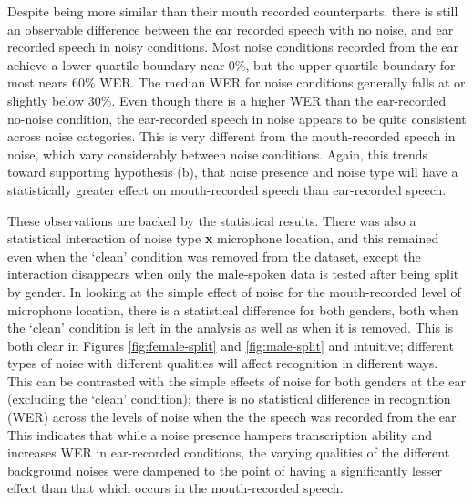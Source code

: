 Despite being more similar than their mouth recorded counterparts, there is still an observable difference between the ear recorded speech with no noise, and ear recorded speech in noisy conditions.  Most noise conditions recorded from the ear achieve a lower quartile boundary near 0\%, but the upper quartile boundary for most nears 60\% WER.  The median WER for noise conditions generally falls at or slightly below 30\%. 
Even though there is a higher WER than the ear-recorded no-noise condition, the ear-recorded speech in noise appears to be quite consistent across noise categories.  This is very different from the mouth-recorded speech in noise, which vary considerably between noise conditions. Again, this trends toward supporting hypothesis (b), that noise presence and noise type will have a statistically greater effect on mouth-recorded speech than ear-recorded speech.

These observations are backed by the statistical results.  There was also a statistical interaction of noise type \textbf{x} microphone location, and this remained even when the `clean' condition was removed from the dataset, except the interaction disappears when only the male-spoken data is tested after being split by gender.  In looking at the simple effect of noise for the mouth-recorded level of microphone location, there is a statistical difference for both genders, both when the `clean' condition is left in the analysis as well as when it is removed.  This is both clear in Figures \ref{fig:female-split} and \ref{fig:male-split} and intuitive; different types of noise with different qualities will affect recognition in different ways.  This can be contrasted with the simple effects of noise for both genders at the ear (excluding the `clean' condition); there is no statistical difference in recognition (WER) across the levels of noise when the the speech was recorded from the ear.  This indicates that while a noise presence hampers transcription ability and increases WER in ear-recorded conditions, the varying qualities of the different background noises were dampened to the point of having a significantly lesser effect than that which occurs in the mouth-recorded speech.

